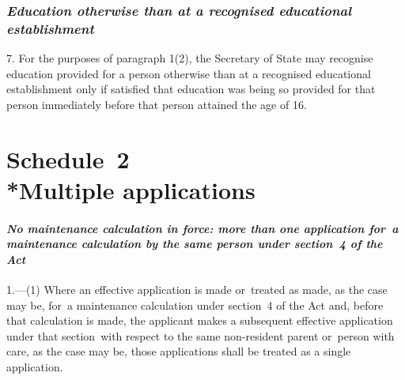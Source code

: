 \documentclass[12pt,a4paper]{article}
\begin{document}

\section*{\itshape Education otherwise than at a recognised educational establishment}

7.  For the purposes of paragraph 1(2), the Secretary of State may recognise education provided for a person otherwise than at a recognised educational establishment only if satisfied that education was being so provided for that person immediately before that person attained the age of 16.


\part[Schedule~2 --- Multiple applications]{Schedule~2\\*Multiple applications}

\renewcommand\parthead{--- Schedule~2}

\subsection*{\itshape No maintenance calculation in force: more than one application for~a maintenance calculation by the same person under section~4 
of the Act}

1.---(1)  Where an effective application is made or~treated as made, as the case may be, for~a maintenance calculation under section~4 
of the Act and, before that calculation is made, the applicant makes a subsequent effective application under that section~with respect to the same non-resident parent or~person with care, as the case may be, those applications shall be treated as a single application.
\end{document}
